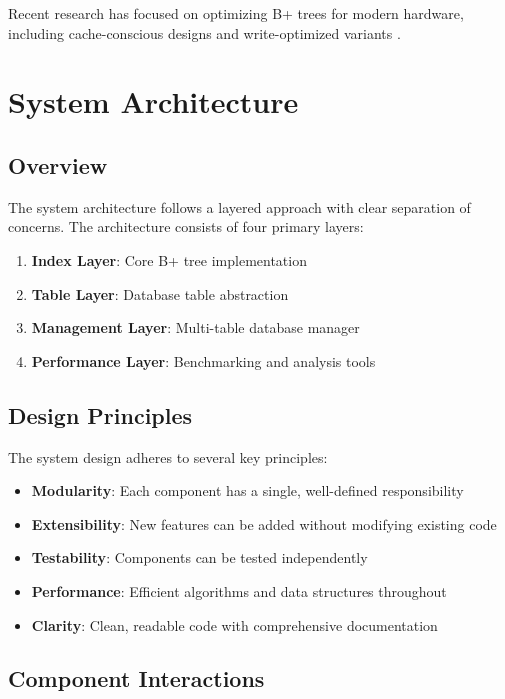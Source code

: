 \documentclass[conference]{IEEEtran}
\begin{document}
Recent research has focused on optimizing B+ trees for modern hardware, including cache-conscious designs \cite{rao2000cache} and write-optimized variants \cite{bender2015introduction}.

\section{System Architecture}

\subsection{Overview}

The system architecture follows a layered approach with clear separation of concerns. The architecture consists of four primary layers:

\begin{enumerate}
    \item \textbf{Index Layer}: Core B+ tree implementation
    \item \textbf{Table Layer}: Database table abstraction
    \item \textbf{Management Layer}: Multi-table database manager
    \item \textbf{Performance Layer}: Benchmarking and analysis tools
\end{enumerate}

\subsection{Design Principles}

The system design adheres to several key principles:

\begin{itemize}
    \item \textbf{Modularity}: Each component has a single, well-defined responsibility
    \item \textbf{Extensibility}: New features can be added without modifying existing code
    \item \textbf{Testability}: Components can be tested independently
    \item \textbf{Performance}: Efficient algorithms and data structures throughout
    \item \textbf{Clarity}: Clean, readable code with comprehensive documentation
\end{itemize}

\subsection{Component Interactions}
\end{document}

